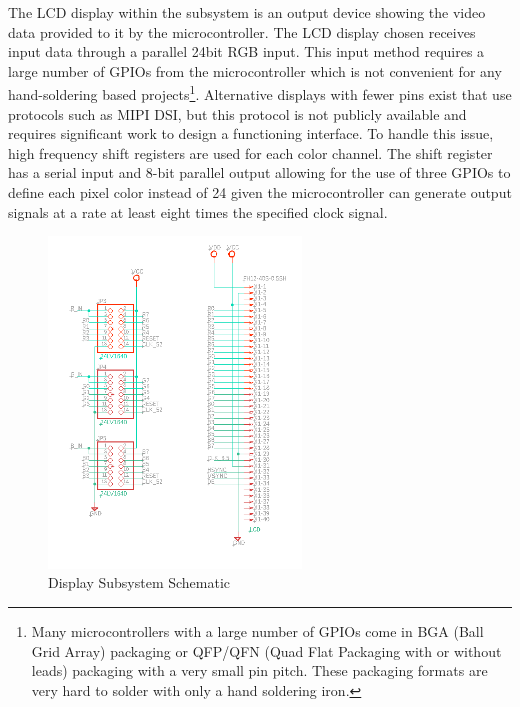 \documentclass[12pt]{article}
\begin{document}
The LCD display within the subsystem is an output device showing the video data provided to it by the microcontroller. The LCD display chosen receives input data through a parallel 24bit RGB input. This input method requires a large number of GPIOs from the microcontroller which is not convenient for any hand-soldering based projects\footnote{Many microcontrollers with a large number of GPIOs come in BGA (Ball Grid Array) packaging or QFP/QFN (Quad Flat Packaging with or without leads) packaging with a very small pin pitch. These packaging formats are very hard to solder with only a hand soldering iron.}. Alternative displays with fewer pins exist that use protocols such as MIPI DSI, but this protocol is not publicly available and requires significant work to design a functioning interface. To handle this issue, high frequency shift registers are used for each color channel. The shift register has a serial input and 8-bit parallel output allowing for the use of three GPIOs to define each pixel color instead of 24 given the microcontroller can generate output signals at a rate at least eight times the specified clock signal.

\begin{figure}[!h]
	\centering
	\includegraphics[width=0.6\textwidth]{Display_Schem.png}
	\caption{Display Subsystem Schematic}
	\label{fig:display_schem}
\end{figure}
\end{document}
